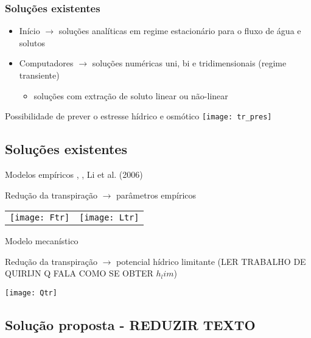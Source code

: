 \begin{frame}\frametitle{Soluções existentes}
    \begin{itemize}
    \item Início $\rightarrow$ soluções analíticas em regime estacionário para o fluxo de água e solutos
    \item Computadores $\rightarrow$ soluções numéricas uni, bi e tridimensionais (regime transiente)
      \begin{itemize}
	\item soluções com extração de soluto linear ou não-linear
      \end{itemize}
  \end{itemize}
  \centering
  Possibilidade de prever o estresse hídrico e osmótico
  \texttt{[image: tr\_pres]}\\
\end{frame}

\subsection{Soluções existentes}
\scriptsize
\begin{frame}
  \begin{block}{Modelos empíricos}
    \cite{feddes78}, \cite{homaee}, Li et al. (2006)

    Redução da transpiração $\rightarrow$ parâmetros empíricos

    \centering
    \begin{tabular}{cc}
      \texttt{[image: Ftr]} &
      \texttt{[image: Ltr]} \\
    \end{tabular}
  \end{block}
  
  \begin{block}{Modelo mecanístico}
    \cite{liersolute}

    Redução da transpiração $\rightarrow$ potencial hídrico limitante (LER TRABALHO DE QUIRIJN Q FALA COMO SE OBTER $h_lim$)
    
    \centering
    \texttt{[image: Qtr]}
  \end{block}
\end{frame}


\subsection{Solução proposta - REDUZIR TEXTO}
  
